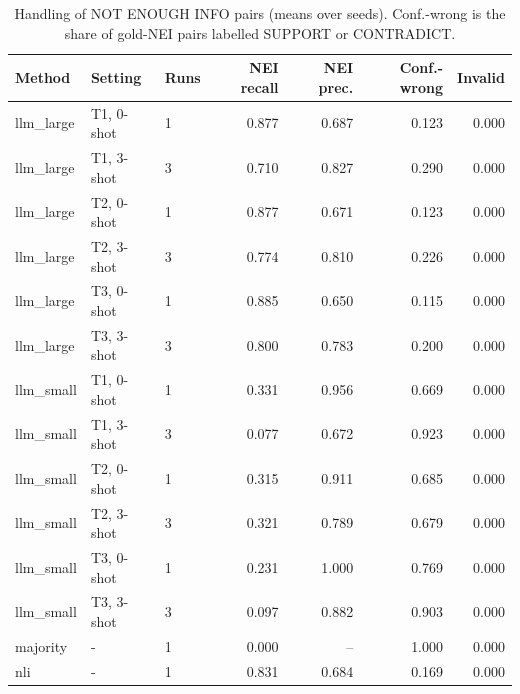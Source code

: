 \begin{table}[t]
\centering
\caption{Handling of NOT ENOUGH INFO pairs (means over seeds). Conf.-wrong is the share of gold-NEI pairs labelled SUPPORT or CONTRADICT.}
\label{tab:nei}
\begin{tabular}{lllrrrr}
\hline
Method & Setting & Runs & NEI recall & NEI prec. & Conf.-wrong & Invalid \\
\hline
llm\_large & T1, 0-shot & 1 & 0.877 & 0.687 & 0.123 & 0.000 \\
llm\_large & T1, 3-shot & 3 & 0.710 & 0.827 & 0.290 & 0.000 \\
llm\_large & T2, 0-shot & 1 & 0.877 & 0.671 & 0.123 & 0.000 \\
llm\_large & T2, 3-shot & 3 & 0.774 & 0.810 & 0.226 & 0.000 \\
llm\_large & T3, 0-shot & 1 & 0.885 & 0.650 & 0.115 & 0.000 \\
llm\_large & T3, 3-shot & 3 & 0.800 & 0.783 & 0.200 & 0.000 \\
llm\_small & T1, 0-shot & 1 & 0.331 & 0.956 & 0.669 & 0.000 \\
llm\_small & T1, 3-shot & 3 & 0.077 & 0.672 & 0.923 & 0.000 \\
llm\_small & T2, 0-shot & 1 & 0.315 & 0.911 & 0.685 & 0.000 \\
llm\_small & T2, 3-shot & 3 & 0.321 & 0.789 & 0.679 & 0.000 \\
llm\_small & T3, 0-shot & 1 & 0.231 & 1.000 & 0.769 & 0.000 \\
llm\_small & T3, 3-shot & 3 & 0.097 & 0.882 & 0.903 & 0.000 \\
majority & - & 1 & 0.000 & -- & 1.000 & 0.000 \\
nli & - & 1 & 0.831 & 0.684 & 0.169 & 0.000 \\
\hline
\end{tabular}
\end{table}